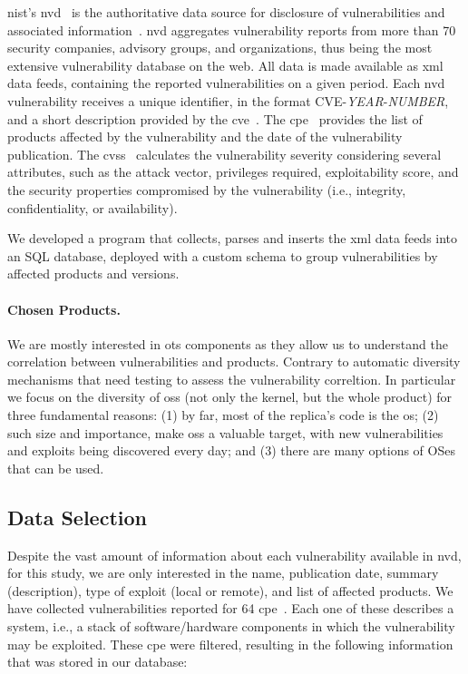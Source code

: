 \gls{nist}'s \gls{nvd}~\cite{nvd} is the authoritative data source for disclosure of vulnerabilities and associated information~\cite{Massacci:2010}. 
\gls{nvd} aggregates vulnerability reports from more than 70 security companies, advisory groups, and organizations, thus being the most extensive vulnerability database on the web. 
All data is made available as \gls{xml} data feeds, containing the reported vulnerabilities on a given period. 
Each \gls{nvd} vulnerability receives a unique identifier, in the format CVE-\textit{YEAR}-\textit{NUMBER}, and a short description provided by the \gls{cve}~\cite{cveterm}. 
The \gls{cpe}~\cite{cpe} provides the list of products affected by the vulnerability and the date of the vulnerability publication.
The \gls{cvss}~\cite{cvss} calculates the vulnerability severity considering several attributes, such as the attack vector, privileges required, exploitability score, and the security properties compromised by the vulnerability (i.e., integrity, confidentiality, or availability).


We developed a program that collects, parses and inserts the \gls{xml} data feeds into an SQL database, deployed with a custom schema to group vulnerabilities by affected products and versions.

\paragraph{Chosen Products.}
We are mostly interested in \gls{ots} components as they allow us to understand the correlation between vulnerabilities and products. 
Contrary to automatic diversity mechanisms that need testing to assess the vulnerability correltion.
In particular we focus on the diversity of \glspl{os} (not only the kernel, but the whole product) for three fundamental reasons: (1) by far, most of the replica’s code is the \gls{os}; (2) such size and importance, make \glspl{os} a valuable target, with new vulnerabilities and exploits being discovered every day; and (3) there are many options of OSes that can be used.



\subsection{Data Selection}
Despite the vast amount of information about each vulnerability available in \gls{nvd}, for this study, we are only interested in the name, publication date, summary (description), type of exploit (local or remote), and list of affected products.
We have collected vulnerabilities reported for 64 \gls{cpe}~\cite{cpe}.
Each one of these describes a system, i.e., a stack of software/hardware components in which the vulnerability may be exploited.
These \gls{cpe} were filtered, resulting in the following information that was stored in our database:

